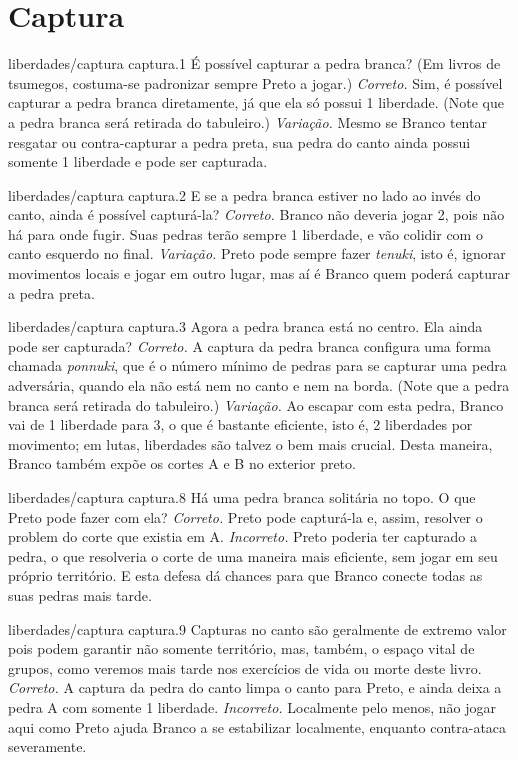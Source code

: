 \chapter{Captura}

\emptypage

\problemAnswerDiagram
  {liberdades/captura}
  {captura.1}
  {É possível capturar a pedra branca? (Em livros de tsumegos, costuma-se padronizar sempre Preto a jogar.)}
  {\emph{Correto.} Sim, é possível capturar a pedra branca diretamente, já que ela só possui 1 liberdade. (Note que a pedra branca será retirada do tabuleiro.)}
  {\emph{Variação.} Mesmo se Branco tentar resgatar ou contra-capturar a pedra preta, sua pedra do canto ainda possui somente 1 liberdade e pode ser capturada.}
  
\problemAnswerDiagram
  {liberdades/captura}
  {captura.2}
  {E se a pedra branca estiver no lado ao invés do canto, ainda é possível capturá-la?}
  {\emph{Correto.} Branco não deveria jogar 2, pois não há para onde fugir. Suas pedras terão sempre 1 liberdade, e vão colidir com o canto esquerdo no final.}
  {\emph{Variação.} Preto pode sempre fazer \emph{tenuki}, isto é, ignorar movimentos locais e jogar em outro lugar, mas aí é Branco quem poderá capturar a pedra preta.}

\problemAnswerDiagram
  {liberdades/captura}
  {captura.3}
  {Agora a pedra branca está no centro. Ela ainda pode ser capturada?}
  {\emph{Correto.} A captura da pedra branca configura uma forma chamada \emph{ponnuki}, que é o número mínimo de pedras para se capturar uma pedra adversária, quando ela não está nem no canto e nem na borda. (Note que a pedra branca será retirada do tabuleiro.)}
  {\emph{Variação.} Ao escapar com esta pedra, Branco vai de 1 liberdade para 3, o que é bastante eficiente, isto é, 2 liberdades por movimento; em lutas, liberdades são talvez o bem mais crucial. Desta maneira, Branco também expõe os cortes A e B no exterior preto.}

\problemAnswerDiagram
  {liberdades/captura}
  {captura.8}
  {Há uma pedra branca solitária no topo. O que Preto pode fazer com ela?}
  {\emph{Correto.} Preto pode capturá-la e, assim, resolver o problem do corte que existia em A.}
  {\emph{Incorreto.} Preto poderia ter capturado a pedra, o que resolveria o corte de uma maneira mais eficiente, sem jogar em seu próprio território. E esta defesa dá chances para que Branco conecte todas as suas pedras mais tarde.}

\problemAnswerDiagram
  {liberdades/captura}
  {captura.9}
  {Capturas no canto são geralmente de extremo valor pois podem garantir não somente território, mas, também, o espaço vital de grupos, como veremos mais tarde nos exercícios de vida ou morte deste livro.}
  {\emph{Correto.} A captura da pedra do canto limpa o canto para Preto, e ainda deixa a pedra A com somente 1 liberdade.}
  {\emph{Incorreto.} Localmente pelo menos, não jogar aqui como Preto ajuda Branco a se estabilizar localmente, enquanto contra-ataca severamente.}

